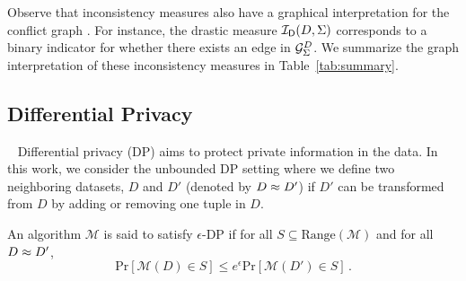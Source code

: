 
Observe that inconsistency measures also have a graphical interpretation for the conflict graph \graph. For instance, the drastic measure $\mathcal{I_\mathsf{D}}(D,{\Sigma})$ corresponds to a binary indicator for whether there exists an edge in ${\mathcal{G}_{{\Sigma}}^{D}}$. We summarize the graph interpretation of these inconsistency measures in Table~\ref{tab:summary}. 




\subsection{Differential Privacy}~\label{sec:prelim-dp}
Differential privacy (DP) \cite{dwork2006calibrating} aims to protect private information in the data. In this work, we consider the unbounded DP setting where we define two neighboring datasets, $D$ and $D'$ (denoted by $D \approx D'$) if $D'$ can be transformed from $D$ by adding or removing one tuple in $D$.

\def\prob{\mathrm{Pr}}

\begin{definition}
    An algorithm $\mathcal{M}$ is said to satisfy $\epsilon$-DP if for all $S\subseteq \mbox{Range}(\mathcal{M})$ and for all $D\approx D'$,
        $$\prob[\mathcal{M}(D)\in S] \leq e^\epsilon \prob[\mathcal{M}(D')\in S]\,.$$
\end{definition}

